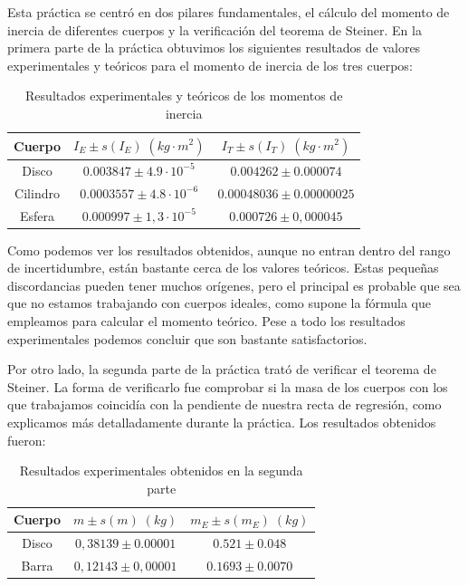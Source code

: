 \documentclass[a4paper,12pt,titlepage]{article}
\begin{document}
Esta práctica se centró en dos pilares fundamentales, el cálculo del momento de inercia de diferentes cuerpos y la verificación del teorema de Steiner. En la primera parte de la práctica obtuvimos los siguientes resultados de valores experimentales y teóricos para el momento de inercia de los tres cuerpos:

\begin{table}[h!]
    \centering
    \begin{tabular}{|c|c|c|}
        \hline
        Cuerpo & $I_E \pm s(I_E) \; (kg \cdot m^2)$ & $I_T \pm s(I_T) \; (kg \cdot m^2)$  \\ \hline
        Disco &$0.003847 \pm 4.9 \cdot 10^{-5}$ & $0.004262 \pm 0.000074$ \\ \hline
        Cilindro & $0.0003557 \pm 4.8 \cdot 10^{-6}$ & $0.00048036 \pm 0.00000025$ \\ \hline 
        Esfera & $0.000997 \pm  1,3 \cdot 10^{-5}$ & $0.000726 \pm 0,000045$ \\ \hline
    \end{tabular}
    \caption{Resultados experimentales y teóricos de los momentos de inercia}
\end{table}

Como podemos ver los resultados obtenidos, aunque no entran dentro del rango de incertidumbre, están bastante cerca de los valores teóricos. Estas pequeñas discordancias pueden tener muchos orígenes, pero el principal es probable que sea que no estamos trabajando con cuerpos ideales, como supone la fórmula que empleamos para calcular el momento teórico. Pese a todo los resultados experimentales podemos concluir que son bastante satisfactorios.

\par Por otro lado, la segunda parte de la práctica trató de verificar el teorema de Steiner. La forma de verificarlo fue comprobar si la masa de los cuerpos con los que trabajamos coincidía con la pendiente de nuestra recta de regresión, como explicamos más detalladamente durante la práctica. Los resultados obtenidos fueron:

\begin{table}[h!]
    \centering
    \begin{tabular}{|c|c|c|}
        \hline
        Cuerpo & $m \pm s(m) \; (kg)$ & $m_E \pm s(m_E) \; (kg)$ \\ \hline
        Disco & $0,38139 \pm 0.00001$ & $0.521 \pm 0.048$ \\ \hline
        Barra & $0,12143 \pm 0,00001$ & $0.1693 \pm 0.0070$ \\ \hline
    \end{tabular}
    \caption{Resultados experimentales obtenidos en la segunda parte}
\end{table}
\end{document}

